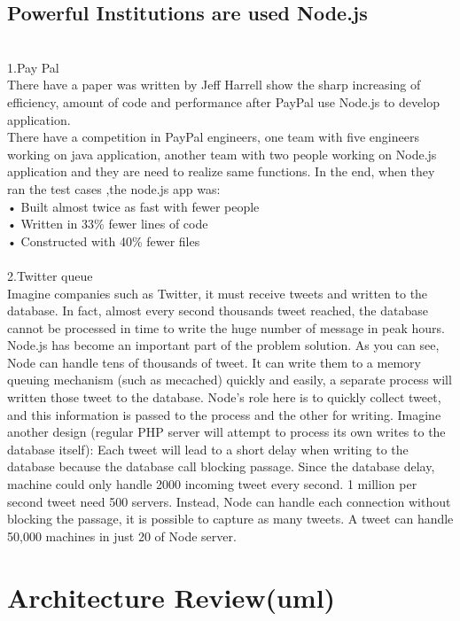 \subsection{Powerful Institutions are used Node.js}
\\	
1.Pay Pal \cite{5}\\
There have a paper was written by Jeff Harrell show the sharp increasing of efficiency, amount of code and performance after PayPal use Node.js to develop application.\\
There have a competition in PayPal engineers, one team with five engineers working on java application, another team with two people working on Node.js application and they are need to realize same functions. In the end, when they ran the test cases ,the node.js app was:\\
•	Built almost twice as fast with fewer people\\
•	Written in 33\% fewer lines of code\\
•	Constructed with 40\% fewer files\\
\\
2.Twitter queue\\
Imagine companies such as Twitter, it must receive tweets and written to the database. In fact, almost every second thousands tweet reached, the database cannot be processed in time to write the huge number of message in peak hours. Node.js has become an important part of the problem solution. As you can see, Node can handle tens of thousands of tweet. It can write them to a memory queuing mechanism (such as mecached) quickly and easily, a separate process will written those tweet to the database. Node's role here is to quickly collect tweet, and this information is passed to the process and the other for writing. Imagine another design (regular PHP server will attempt to process its own writes to the database itself): Each tweet will lead to a short delay when writing to the database because the database call blocking passage. Since the database delay, machine could only handle 2000 incoming tweet every second. 1 million per second tweet need 500 servers. Instead, Node can handle each connection without blocking the passage, it is possible to capture as many tweets. A tweet can handle 50,000 machines in just 20 of Node server.
\\
\section{Architecture Review(uml)} 
